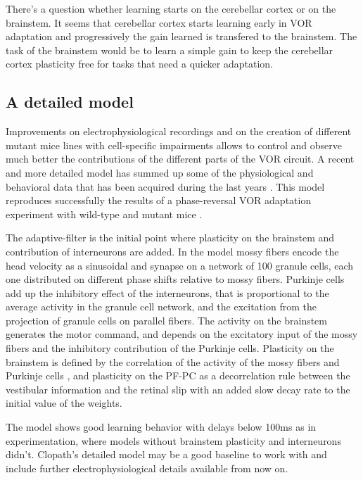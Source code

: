 \documentclass[doc,apacite,a4paper]{apa6}
\begin{document}
There's a question whether learning starts on the cerebellar cortex or on the brainstem. It seems that cerebellar cortex starts learning early in VOR adaptation and progressively the gain learned is transfered to the brainstem. The task of the brainstem would be to learn a simple gain to keep the cerebellar cortex plasticity free for tasks that need a quicker adaptation.

\subsection{A detailed model}

Improvements on electrophysiological recordings and on the creation of different mutant mice lines with cell-specific impairments allows to control and observe much better the contributions of the different parts of the VOR circuit. A recent and more detailed model has summed up some of the physiological and behavioral data that has been acquired during the last years \cite{Clopath2014}. This model reproduces successfully the results of a phase-reversal VOR adaptation experiment with wild-type and mutant mice \cite{Wulff2009}.

The adaptive-filter is the initial point where plasticity on the brainstem and contribution of interneurons are added. In the model mossy fibers encode the head velocity as a sinusoidal \cite{Manuscript2009} and synapse on a network of 100 granule cells, each one distributed on different phase shifts relative to mossy fibers. Purkinje cells add up the inhibitory effect of the interneurons, that is proportional to the average activity in the granule cell network, and the excitation from the projection of granule cells on parallel fibers. The activity on the brainstem generates the motor command, and depends on the excitatory input of the mossy fibers and the inhibitory contribution of the Purkinje cells. Plasticity on the brainstem is defined by the correlation of the activity of the mossy fibers and Purkinje cells \cite{Menzies2010}, and plasticity on the PF-PC as a decorrelation rule between the vestibular information and the retinal slip \cite{Dean2002} with an added slow decay rate to the initial value of the weights.

The model shows good learning behavior with delays below 100ms as in experimentation, where models without brainstem plasticity and interneurons didn't. Clopath's detailed model may be a good baseline to work with and include further electrophysiological details available from now on.


\end{document}
